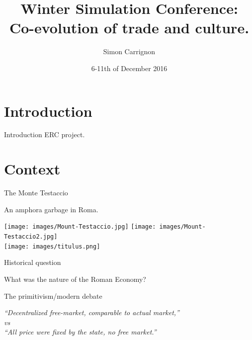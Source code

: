 \documentclass[12pt, handout=show,notes=show]{beamer}
\title{
	Winter Simulation Conference:\\
	Co-evolution of trade and culture.
}
\date{6-11th of December 2016}
\author{Simon Carrignon}
\begin{document}
\begin{frame}
	\maketitle

\end{frame}

\section{Introduction}
\begin{frame}{Introduction}
    ERC project.
\end{frame}



\section{Context}

\begin{frame}{The Monte Testaccio}

	An amphora garbage in Roma.\\

	\begin{center}
		\texttt{[image: images/Mount-Testaccio.jpg]}
		\hfil \texttt{[image: images/Mount-Testaccio2.jpg]}\\
		\vfill
		\texttt{[image: images/titulus.png]}

	\end{center}

\end{frame}

\begin{frame}{Historical question}
	\begin{center}
		\Huge
		What was the nature of the Roman Economy?\\
	\end{center}
	\vfill
	\begin{block}
		{The primitivism/modern debate}
		\begin{center}
		    \em
		    ``Decentralized free-market, comparable to actual market,'' \\
		    \emph{vs}\\
		    ``All price were fixed by the state, no free market.''
		\end{center}
	\end{block}
\end{frame}
\end{document}
